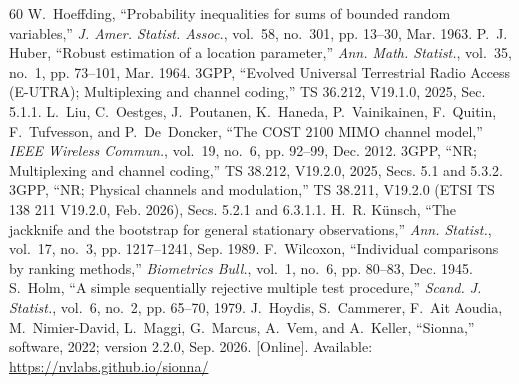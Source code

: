 \documentclass[journal]{IEEEtran}
\theoremstyle{remark}
\begin{document}
\begin{thebibliography}{60}
 W.~Hoeffding, ``Probability inequalities for sums of bounded random variables,'' \emph{J. Amer. Statist. Assoc.}, vol.~58, no.~301, pp. 13--30, Mar. 1963.
 P.~J. Huber, ``Robust estimation of a location parameter,'' \emph{Ann. Math. Statist.}, vol.~35, no.~1, pp. 73--101, Mar. 1964.
 3GPP, ``Evolved Universal Terrestrial Radio Access (E-UTRA); Multiplexing and channel coding,'' TS 36.212, V19.1.0, 2025, Sec. 5.1.1.
 L.~Liu, C.~Oestges, J.~Poutanen, K.~Haneda, P.~Vainikainen, F.~Quitin, F.~Tufvesson, and P.~De~Doncker, ``The COST 2100 MIMO channel model,'' \emph{IEEE Wireless Commun.}, vol.~19, no.~6, pp. 92--99, Dec. 2012.
 3GPP, ``NR; Multiplexing and channel coding,'' TS 38.212, V19.2.0, 2025, Secs. 5.1 and 5.3.2.
 3GPP, ``NR; Physical channels and modulation,'' TS 38.211, V19.2.0 (ETSI TS 138 211 V19.2.0, Feb. 2026), Secs. 5.2.1 and 6.3.1.1.
 H.~R. K{\"u}nsch, ``The jackknife and the bootstrap for general stationary observations,'' \emph{Ann. Statist.}, vol.~17, no.~3, pp. 1217--1241, Sep. 1989.
 F.~Wilcoxon, ``Individual comparisons by ranking methods,'' \emph{Biometrics Bull.}, vol.~1, no.~6, pp. 80--83, Dec. 1945.
 S.~Holm, ``A simple sequentially rejective multiple test procedure,'' \emph{Scand. J. Statist.}, vol.~6, no.~2, pp. 65--70, 1979.
 J.~Hoydis, S.~Cammerer, F.~Ait Aoudia, M.~Nimier-David, L.~Maggi, G.~Marcus, A.~Vem, and A.~Keller, ``Sionna,'' software, 2022; version 2.2.0, Sep. 2026. [Online]. Available: \url{https://nvlabs.github.io/sionna/}
\end{thebibliography}
\end{document}
